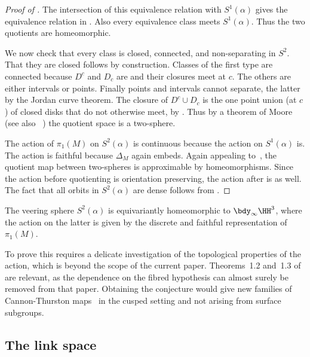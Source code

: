 \documentclass[12pt]{amsart}
\begin{document}
\begin{proof}[Proof of ]
The intersection of this equivalence relation with $S^1(\alpha)$ gives the equivalence relation in . Also every equivalence class meets $S^1(\alpha)$. Thus the two quotients are homeomorphic.

We now check that every class is closed, connected, and non-separating in $S^2$.  That they are closed follows by construction.  Classes of the first type are connected because $D^c$ and $D_c$ are and their closures meet at $c$.  The others are either intervals or points.  Finally points and intervals cannot separate, the latter by the Jordan curve theorem.  The closure of $D^c \cup D_c$ is the one point union (at $c$) of closed disks that do not otherwise meet, by .  
Thus by a theorem of Moore~\cite[Theorem~25]{Moore25} (see also ~\cite[Theorem~10.18]{Calegari07}) the quotient space is a two-sphere.  

The action of $\pi_1(M)$ on $S^2(\alpha)$ is continuous because the action on $S^1(\alpha)$ is.  The action is faithful because $\Delta_M$ again embeds.  Again appealing to~\cite[Theorem~10.18]{Calegari07}, the quotient map between two-spheres is approximable by homeomorphisms.  Since the action before quotienting is orientation preserving, the action after is as well. The fact that all orbits in $S^2(\alpha)$ are dense follows from .
\end{proof}

\begin{conjecture}
The veering sphere $S^2(\alpha)$ is equivariantly homeomorphic to $\bdy_\infty \HH^3$, where the action on the latter is given by the discrete and faithful representation of $\pi_1(M)$.
\end{conjecture}

\begin{remark}
To prove this requires a delicate investigation of the topological properties of the action, which is beyond the scope of the current paper.  Theorems~1.2 and~1.3 of \cite{Gueritaud16} are relevant, as the dependence on the fibred hypothesis can almost surely be removed from that paper.  Obtaining the conjecture would give new families of Cannon-Thurston maps~\cite{CannonThurston07} in the cusped setting and not arising from surface subgroups. 
\end{remark}

\subsection{The link space}
\end{document}
